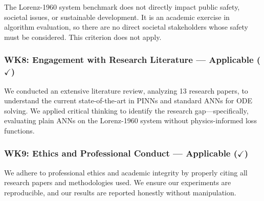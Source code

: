 The Lorenz-1960 system benchmark does not directly impact public safety, societal issues, or sustainable development. It is an academic exercise in algorithm evaluation, so there are no direct societal stakeholders whose safety must be considered. This criterion does not apply.

\subsubsection{WK8: Engagement with Research Literature --- Applicable ($\checkmark$)}

We conducted an extensive literature review, analyzing 13 research papers, to understand the current state-of-the-art in PINNs and standard ANNs for ODE solving. We applied critical thinking to identify the research gap---specifically, evaluating plain ANNs on the Lorenz-1960 system without physics-informed loss functions.

\subsubsection{WK9: Ethics and Professional Conduct --- Applicable ($\checkmark$)}

We adhere to professional ethics and academic integrity by properly citing all research papers and methodologies used. We ensure our experiments are reproducible, and our results are reported honestly without manipulation.
